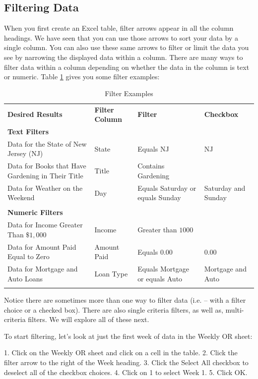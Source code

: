 \subsection{Filtering Data}

When you first create an Excel table, filter arrows appear in all the column headings. We have seen
that you can use those arrows to sort your data by a single column. You can also use these same arrows
to filter or limit the data you see by narrowing the displayed data within a column. There are many
ways to filter data within a column depending on whether the data in the column is text or numeric.
Table \ref{05:tab05} gives you some filter examples:

{\fontsize{8}{10} \selectfont
	\begin{longtable}{p{1.5in}p{0.75in}p{1.0in}p{0.75in}} %
		\textbf{Desired Results} & \textbf{Filter Column} & \textbf{Filter} & \textbf{Checkbox} \endhead
		\hline \\
		\multicolumn{4}{l}{\textbf{Text Filters}} \\
		Data for the State of New Jersey (NJ) & State & Equals NJ & NJ \\
		Data for Books that Have Gardening in Their Title & Title & Contains Gardening & \\
		Data for Weather on the Weekend & Day & Equals Saturday or equals Sunday & Saturday and Sunday \\
		\hline \\
		\multicolumn{4}{l}{\textbf{Numeric Filters}} \\
		Data for Income Greater Than $ \$1,000 $ & Income & Greater than $ 1000 $ & \\
		Data for Amount Paid Equal to Zero & Amount Paid & Equals 0.00 & 0.00 \\
		Data for Mortgage and Auto Loans & Loan Type & Equals Mortgage or equals Auto & Mortgage and Auto \\
		\caption{Filter Examples}
		\label{05:tab05}
	\end{longtable}
}


Notice there are sometimes more than one way to filter data (i.e. – with a filter choice or a checked
box). There are also single criteria filters, as well as, multi-criteria filters. We will explore all of these
next.

To start filtering, let’s look at just the first week of data in the Weekly OR sheet:

1.    Click on the Weekly OR sheet and click on a cell in the table.
2.    Click the filter arrow to the right of the Week heading.
3.    Click the Select All checkbox to deselect all of the checkbox choices.
4.    Click on 1 to select Week 1.
5.    Click OK.


